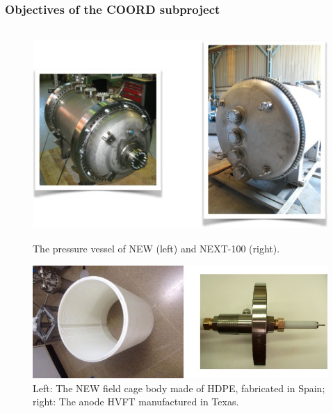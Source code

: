 %
%

\subsubsection*{Objectives of the COORD subproject}

\begin{figure}
\centering
\includegraphics[height=8cm]{img/PV.jpg}
\caption{The pressure vessel of NEW (left) and NEXT-100 (right).} \label{fig:PV}
\end{figure}

\begin{figure}[t!b!]
\begin{center}
\includegraphics[width=.9\textwidth]{img/FC3.jpg}
\end{center}
\caption{Left: The NEW field cage body made of HDPE, fabricated in Spain; right: The anode HVFT manufactured in Texas.
} \label{fig:FC}
\end{figure}


